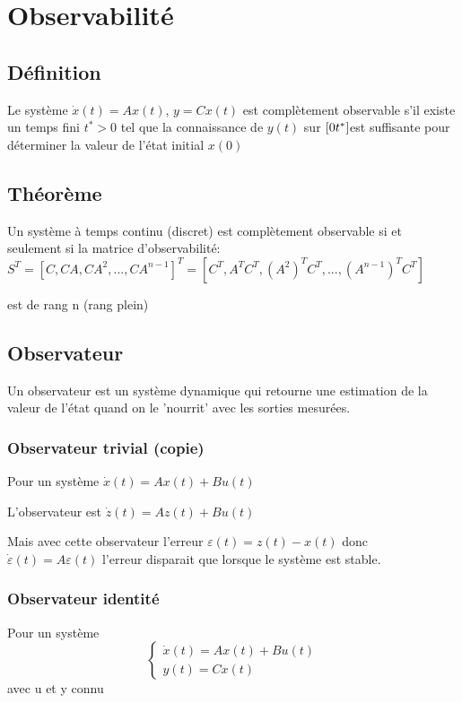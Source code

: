 \documentclass[resume]{subfiles}
\begin{document}
\section{Observabilité}
\subsection{Définition}

Le système $\dot{x}(t) = Ax (t)$, $y = Cx(t)$   est complètement observable s'il existe un temps fini $t^* > 0$ tel que la  connaissance de $y (t)$  sur $[0\space t^*]$est suffisante pour déterminer la valeur de l'état initial $x(0)$

\subsection{Théorème}

Un système à temps continu (discret) est complètement observable si et  seulement si la matrice d'observabilité: $S^T = [C, CA, CA^2 ,..., CA^{n-1}]^T = [C^T, A^TC^T , (A^2)^T C^T,..., (A^{n-1})^T C^T]$ 

 est de rang n (rang plein)

\subsection{Observateur}

Un observateur est un système dynamique qui retourne une estimation de la valeur de l'état quand on le 'nourrit' avec les sorties mesurées.

\subsubsection{Observateur trivial (copie)}

Pour un système $\dot{x}(t)=Ax(t)+Bu(t)$

L'observateur est $\dot{z}(t)= Az(t)+Bu(t)$

Mais avec cette observateur l'erreur $\varepsilon(t)=z(t)-x(t)$ donc $\dot{\varepsilon}(t)=A\varepsilon(t)$ l'erreur disparait que lorsque le système est stable.

\subsubsection{Observateur identité}

Pour un système \begin{equation}\begin{cases}\dot{x}(t)=Ax(t)+Bu(t)\\y(t)=Cx(t)\end{cases}\end{equation} avec u et y connu
\end{document}
